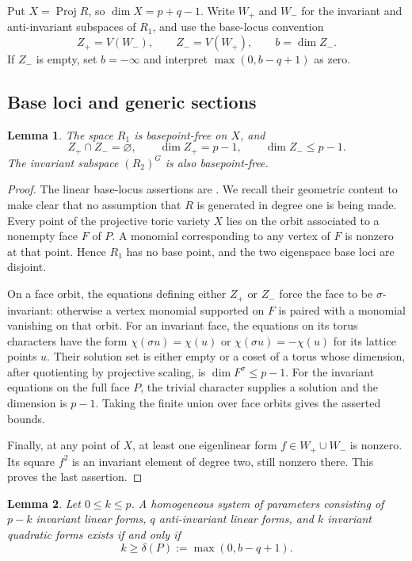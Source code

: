 \documentclass[11pt,a4paper]{article}
\newtheorem{lemma}{Lemma}[section]
\theoremstyle{definition}
\theoremstyle{remark}\newtheorem{remark}[lemma]{Remark}
\begin{document}
Put $X=\operatorname{Proj}R$, so $\dim X=p+q-1$. Write $W_+$ and $W_-$
for the invariant and anti-invariant subspaces of $R_1$, and use the
base-locus convention
\[
 Z_+=V(W_-),\qquad Z_-=V(W_+),\qquad b=\dim Z_-.
\]
If $Z_-$ is empty, set $b=-\infty$ and interpret
$\max(0,b-q+1)$ as zero.

\subsection{Base loci and generic sections}

\begin{lemma}\label{lem:ehrhart-base-loci}
The space $R_1$ is basepoint-free on $X$, and
\[
 Z_+\cap Z_-=\varnothing,\qquad
 \dim Z_+=p-1,\qquad \dim Z_-\leq p-1.
\]
The invariant subspace $(R_2)^G$ is also basepoint-free.
\end{lemma}

\begin{proof}
The linear base-locus assertions are
\cite[Lemmas~7.1(a) and~7.3]{Clarke26}. We recall their geometric content
to make clear that no assumption that $R$ is generated in degree one is
being made. Every point of the projective toric variety $X$ lies on the
orbit associated to a nonempty face $F$ of $P$. A monomial corresponding
to any vertex of $F$ is nonzero at that point. Hence $R_1$ has no base
point, and the two eigenspace base loci are disjoint.

On a face orbit, the equations defining either $Z_+$ or $Z_-$ force the
face to be $\sigma$-invariant: otherwise a vertex monomial supported on
$F$ is paired with a monomial vanishing on that orbit. For an invariant
face, the equations on its torus characters have the form
$\chi(\sigma u)=\chi(u)$ or $\chi(\sigma u)=-\chi(u)$ for its lattice
points $u$. Their solution set is either empty or a coset of a torus
whose dimension, after quotienting by projective scaling, is
$\dim F^\sigma\leq p-1$. For the invariant equations on the full face
$P$, the trivial character supplies a solution and the dimension is
$p-1$. Taking the finite union over face orbits gives the asserted bounds.

Finally, at any point of $X$, at least one eigenlinear form
$f\in W_+\cup W_-$ is nonzero. Its square $f^2$ is an invariant element
of degree two, still nonzero there. This proves the last assertion.
\end{proof}

\begin{lemma}\label{lem:ehrhart-mixed-incidence}
Let $0\leq k\leq p$. A homogeneous system of parameters consisting of
$p-k$ invariant linear forms, $q$ anti-invariant linear forms, and $k$
invariant quadratic forms exists if and only if
\begin{equation}\label{eq:ehrhart-budget}
 k\geq\delta(P):=\max(0,b-q+1).
\end{equation}
\end{lemma}
\end{document}

